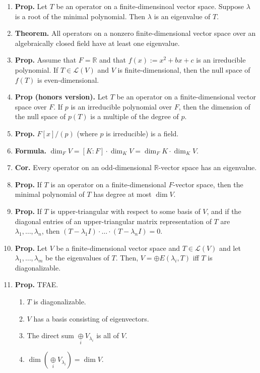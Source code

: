 \begin{enumerate}
	\item \textbf{Prop. } Let $T$ be an operator on a finite-dimensinoal vector space. Suppose $\lambda$ is a root of the minimal polynomial. Then $\lambda$ is an eigenvalue of $T$. 
	\item \textbf{Theorem. } All operators on a nonzero finite-dimensional vector space over an algebraically closed field have at least one eigenvalue. 
	\item \textbf{Prop. } Assume that $F = \mathbb{R}$ and that $f(x) := x^2 + bx + c$ is an irreducible polynomial. If $T \in \mathscr{L}(V)$ and $V$ is finite-dimensional, then the null space of $f(T)$ is even-dimensional. 
	\item \textbf{Prop (honors version). } Let $T$ be an operator on a finite-dimensional vector space over $F$. If $p$ is an irreducible polynomial over $F$, then the dimension of the null space of $p(T)$ is a multiple of the degree of $p$. 
	\item \textbf{Prop. } $F[x] / (p)$ (where $p$ is irreducible) is a field. 
	\item \textbf{Formula. } $\dim_F V = [K:F] \cdot \dim_K V = \dim_F K \cdot \dim_K V$. 
	\item \textbf{Cor. } Every operator on an odd-dimensional $\mathbb{R}$-vector space has an eigenvalue. 
	\item \textbf{Prop. } If $T$ is an operator on a finite-dimensional $F$-vector space, then the minimal polynomial of $T$ has degree at most $\dim V$. 
	\item \textbf{Prop. } If $T$ is upper-triangular with respect to some basis of $V$, and if the diagonal entries of an upper-triangular matrix representation of $T$ are $\lambda_1,\dots,\lambda_n$, then $(T-\lambda_1I) \cdot \dots \cdot (T-\lambda_nI)=0$. 
	\item \textbf{Prop. } Let $V$ be a finite-dimensional vector space and $T \in \mathscr{L}(V)$ and let $\lambda_1,\dots,\lambda_m$ be the eigenvalues of $T$. Then, $V = \oplus E(\lambda_i, T)$ iff $T$ is diagonalizable. 
	\item \textbf{Prop. } TFAE. 
	\begin{enumerate}
		\item $T$ is diagonalizable. 
		\item $V$ has a basis consisting of eigenvectors. 
		\item The direct sum $\underset{i}{\oplus} V_{\lambda_i}$ is all of $V$. 
		\item $\dim \left(\underset{i}{\oplus} V_{\lambda_i} \right) = \dim V$. 

\end{enumerate}
\end{enumerate}
